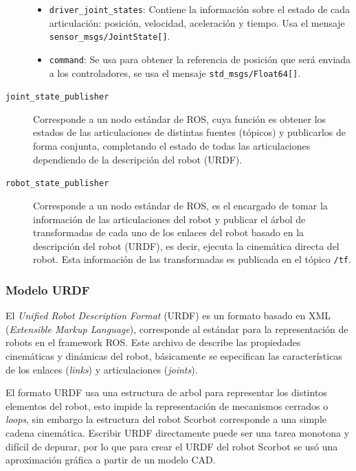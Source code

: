 \begin{description}
\begin{itemize}
\item \texttt{driver\_joint\_states}: Contiene la información sobre el estado de cada articulación: posición, velocidad, aceleración y tiempo. Usa el mensaje  \texttt{sensor\_msgs/JointState[]}.

\item  \texttt{command}: Se usa para obtener la referencia de posición que será enviada a los controladores, se usa el mensaje \texttt{std\_msgs/Float64[]}.
 
\end{itemize}



\item[\texttt{joint\_state\_publisher}] Corresponde a un nodo estándar de ROS, cuya función es obtener los estados de las articulaciones de distintas fuentes (tópicos) y publicarlos de forma conjunta, completando el estado de todas las articulaciones dependiendo de la descripción del robot (URDF).

\item[\texttt{robot\_state\_publisher}] Corresponde a un nodo estándar de ROS, es el encargado de tomar la información de las articulaciones del robot y publicar el árbol de transformadas de cada uno de los enlaces del robot basado en la descripción del robot (URDF), es decir, ejecuta la cinemática directa del robot. Esta información de las transformadas es publicada en el tópico \texttt{/tf}.

\end{description}


\subsubsection{Modelo URDF}

El \textit{Unified Robot Description Format} (URDF) es un formato basado en XML (\textit{Extensible Markup Language}), corresponde al estándar para la representación de robots en el framework ROS. Este archivo de describe las propiedades cinemáticas y dinámicas del robot, básicamente se especifican las características de los enlaces (\textit{links}) y articulaciones (\textit{joints}).

El formato URDF usa una estructura de arbol para representar los distintos elementos del robot, esto impide la representación de mecanismos cerrados o \textit{loops}, sin embargo la estructura del robot Scorbot corresponde a una simple cadena cinemática. Escribir URDF directamente puede ser una tarea monotona y difícil de depurar, por lo que para crear el URDF del robot Scorbot se usó una aproximación gráfica a partir de un modelo CAD.


